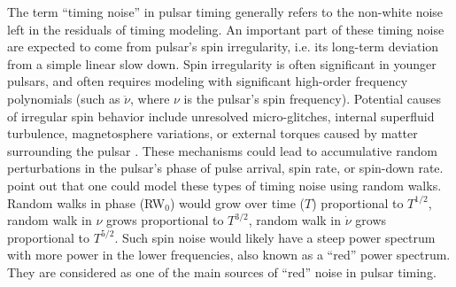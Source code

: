 The term ``timing noise'' in pulsar timing generally refers to the non-white
noise left in the residuals of timing modeling.
An important part of these timing noise are expected to come from pulsar's spin
irregularity, i.e. its long-term deviation from a simple linear slow down. 
Spin irregularity is often significant in younger pulsars, and often
requires modeling with significant high-order frequency polynomials (such as $\ddot{\nu}$, where $\nu$ is the pulsar's spin frequency). 
Potential causes of irregular spin behavior include unresolved
micro-glitches, internal superfluid turbulence, magnetosphere variations, or external torques caused by matter surrounding the pulsar \citep{hlk10, ymh+13, ml14}.
These mechanisms could lead to accumulative random perturbations in the 
pulsar's phase of pulse arrival, spin rate, or spin-down rate. 
\citet{sc10} point out that one could model these types of timing noise using random walks.
Random walks in phase (RW$_0$) would grow over time ($T$) proportional to
$T^{1/2}$, random walk in $\nu$ grows proportional to $T^{3/2}$, random walk in
$\dot{\nu}$ grows proportional to $T^{5/2}$.
Such spin noise would likely have a steep power spectrum with more power in
the lower frequencies, also known as a ``red'' power spectrum. They
are considered as one of the main sources of ``red'' noise in pulsar timing.


